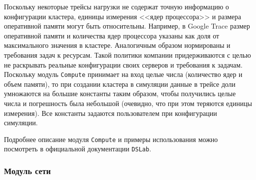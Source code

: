 Поскольку некоторые трейсы нагрузки не содержат точную информацию о конфигурации кластера, единицы измерения <<ядер процессора>> и размера оперативной памяти могут быть относительны. Например, в Google Trace\cite{google-clusterdata} размер оперативной памяти и количества ядер процессора указаны как доля от максимального значения в кластере. Аналогичным образом нормированы и требования задач к ресурсам. Такой политики компании придерживаются с целью не раскрывать реальные конфигурации своих серверов и требования к задачам. Поскольку модуль \texttt{Compute} принимает на вход целые числа (количество ядер и объем памяти), то при создании кластера в симуляции данные в трейсе доли умножаются на большие константы таким образом, чтобы получились целые числа и погрешность была небольшой (очевидно, что при этом теряются единицы измерения). Все константы задаются пользователем при конфигурации симуляции. 

Подробнее описание модуля \texttt{Compute} и примеры использования можно посмотреть в официальной документации \texttt{DSLab}\cite{dslab-compute-docs}.

\subsubsection{Модуль сети}\label{sec:network-model}

